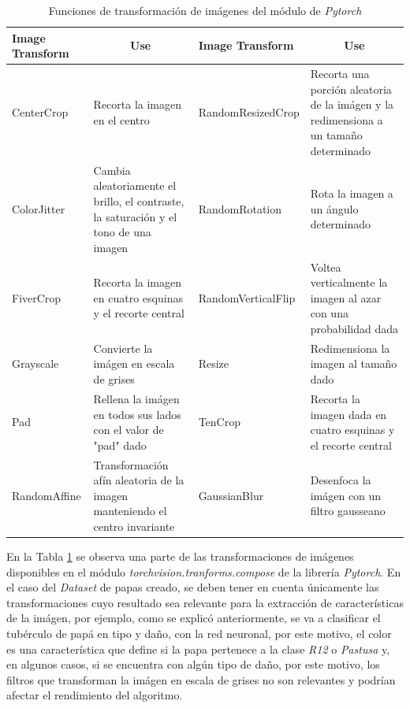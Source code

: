 \begin{table}[ht]
	\centering
	\begin{tabular}{|p{3cm}|p{4cm}|p{3.8cm}|p{4cm}|}
		\hline
		Image Transform       & \multicolumn{1}{c|}{Use}                                                               & Image Transform       & \multicolumn{1}{c|}{Use}                                                                        \\ \hline
		CenterCrop            & Recorta la imagen en el centro                                                         & RandomResizedCrop     & Recorta una porción aleatoria de la imágen y la redimensiona a un tamaño determinado            \\ \hline
		ColorJitter           & Cambia aleatoriamente el brillo, el contraste, la saturación y el tono de una imagen   & RandomRotation        & Rota la imagen a un ángulo determinado                                                          \\ \hline
		FiverCrop              & Recorta la imagen en cuatro esquinas y el recorte central                              & RandomVerticalFlip    & Voltea verticalmente la imagen al azar con una probabilidad dada                                \\ \hline
		Grayscale             & Convierte la imágen en escala de grises                                                & Resize                & Redimensiona la imagen al tamaño dado                                                           \\ \hline
		Pad                   & Rellena la imágen en todos sus lados con el valor de "pad" dado                        & TenCrop               & Recorta la imagen dada en cuatro esquinas y el recorte central \\ \hline
		RandomAffine          & Transformación afín aleatoria de la imagen manteniendo el centro invariante            & GaussianBlur          & Desenfoca la imágen con un filtro gausseano                                                                                                                     \\ \hline
	\end{tabular}
	\caption{Funciones de transformación de imágenes del módulo de \textit{Pytorch}}
	\label{table:Filters1}
\end{table}

En la Tabla \ref{table:Filters1} se observa una parte de las transformaciones de imágenes disponibles en el módulo \textit{torchvision.tranforms.compose} de la librería \textit{Pytorch}. En el caso del \textit{Dataset} de papas creado, se deben tener en cuenta únicamente las transformaciones cuyo resultado sea relevante para la extracción de características de la imágen, por ejemplo, como se explicó anteriormente, se va a clasificar el tubérculo de papá en tipo y daño, con la red neuronal, por este motivo, el color es una característica que define si la papa pertenece a la clase \textit{R12} o \textit{Pastusa} y, en algunos casos, si se encuentra con algún tipo de daño, por este motivo, los filtros que transforman la imágen en escala de grises no son relevantes y podrían afectar el rendimiento del algoritmo.

